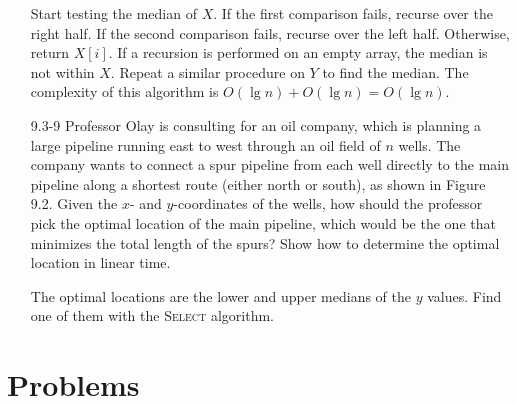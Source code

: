 \begin{enumerate}
\begin{framed}
Start testing the median of $X$. If the first comparison fails, recurse over the
right half. If the second comparison fails, recurse over the left half.
Otherwise, return $X[i]$. If a recursion is performed on an empty array, the
median is not within $X$. Repeat a similar procedure on $Y$ to find the median.
The complexity of this algorithm is $O(\lg n) + O(\lg n) = O(\lg n)$.
\end{framed}

\item[9.3-9]{Professor Olay is consulting for an oil company, which is planning
a large pipeline running east to west through an oil field of $n$ wells. The
company wants to connect a spur pipeline from each well directly to the main
pipeline along a shortest route (either north or south), as shown in Figure 9.2.
Given the $x$- and $y$-coordinates of the wells, how should the professor pick
the optimal location of the main pipeline, which would be the one that minimizes
the total length of the spurs? Show how to determine the optimal location in
linear time.}

\begin{framed}
The optimal locations are the lower and upper medians of the $y$ values. Find
one of them with the \textsc{Select} algorithm.
\end{framed}

\end{enumerate}

\newpage

\section*{Problems}
%

